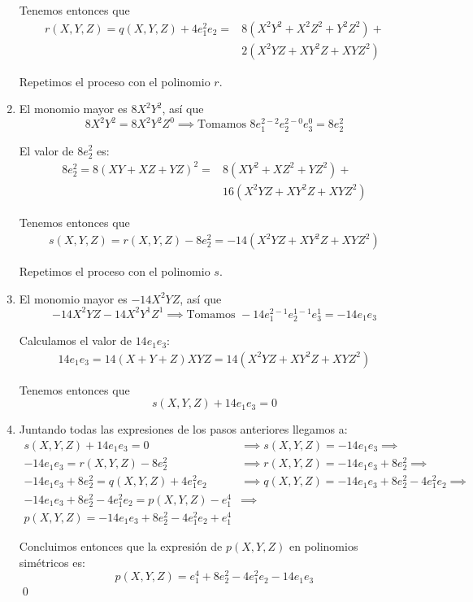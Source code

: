 \documentclass[a4paper, 11pt]{article}
\begin{document}
\begin{solucion}
\begin{enumerate}
          Tenemos entonces que
          \begin{align*}
              r(X,Y,Z) = q(X,Y,Z) + 4e_1^2e_2 = &8(X^2Y^2 + X^2Z^2 + Y^2Z^2) +\\
                                                &2(X^2YZ + XY^2Z + XYZ^2)
          \end{align*}

          Repetimos el proceso con el polinomio $r$.

          \item El monomio mayor es $8X^2Y^2$, así que
          \[
          8X^2Y^2 = 8X^2Y^2Z^0 \implies \textrm{Tomamos } 8e_1^{2-2}e_2^{2-0}e_3^0 = 8e_2^2
          \]

          El valor de $8e_2^2$ es:
          \begin{align*}
              8e_2^2 = 8(XY+XZ+YZ)^2 = &8(XY^2+XZ^2+YZ^2) +\\
                                      &16(X^2YZ+XY^2Z+XYZ^2)
          \end{align*}

          Tenemos entonces que
          \begin{align*}
              s(X,Y,Z) = r(X,Y,Z) - 8e_2^2 = -14(X^2YZ+XY^2Z+XYZ^2)
          \end{align*}

          Repetimos el proceso con el polinomio $s$.

          \item El monomio mayor es $-14X^2YZ$, así que
          \[
          -14X^2YZ -14X^2Y^1Z^1 \implies \textrm{Tomamos } -14e_1^{2-1}e_2^{1-1}e_3^1 = -14e_1e_3
          \]

          Calculamos el valor de $14e_1e_3$:
          \begin{align*}
              14e_1e_3 = 14(X + Y + Z)XYZ = 14(X^2YZ + XY^2Z + XYZ^2)
          \end{align*}

          Tenemos entonces que
          \[
          s(X,Y,Z) + 14e_1e_3 = 0
          \]

          \item Juntando todas las expresiones de los pasos anteriores llegamos a:
          \begin{align*}
              s(X,Y,Z) + 14e_1e_3 = 0 &\implies s(X,Y,Z) = -14e_1e_3 \implies\\
              -14e_1e_3 = r(X,Y,Z) - 8e_2^2 &\implies r(X,Y,Z) = -14e_1e_3 + 8e_2^2 \implies\\
              -14e_1e_3 + 8e_2^2 = q(X,Y,Z) + 4e_1^2e_2 &\implies q(X,Y,Z) = -14e_1e_3 + 8e_2^2 - 4e_1^2e_2 \implies\\
              -14e_1e_3 + 8e_2^2 - 4e_1^2e_2 = p(X,Y,Z) - e_1^4 &\implies\\
              p(X,Y,Z) = -14e_1e_3 + 8e_2^2 - 4e_1^2e_2 + e_1^4
          \end{align*}

          Concluimos entonces que la expresión de $p(X,Y,Z)$ en polinomios simétricos es:
          \[
          p(X,Y,Z) = e_1^4 + 8e_2^2 - 4e_1^2e_2 - 14e_1e_3
          \]
          \qed
      \end{enumerate}
  \end{solucion}
\end{document}
